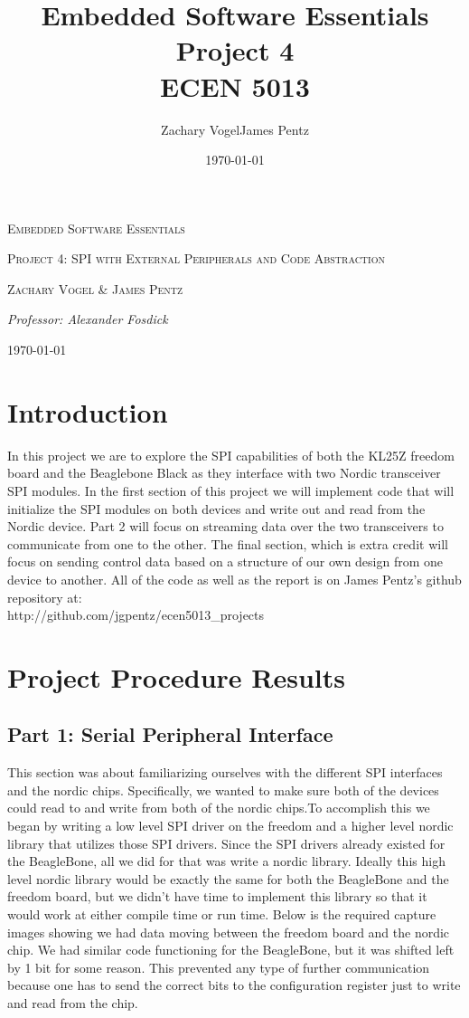 \documentclass{article}
\author{Zachary Vogel\quad James Pentz}
\title{Embedded Software Essentials Project 4\\ ECEN 5013}
\date{\today}
\begin{document}
\begin{titlepage}
    \centering
    \vspace*{2cm}
    {\scshape\Huge Embedded Software Essentials \par}
    \vspace{2cm}
    {\scshape\Large Project 4: SPI with External Peripherals and Code Abstraction \par}
    \vspace{2.5cm}
    {\Large \scshape Zachary Vogel \& James Pentz\par}
    \vspace{1cm}
    {\large \itshape Professor: Alexander Fosdick}
    \vfill
    {\large \today\par}
\end{titlepage}

\section*{Introduction}
In this project we are to explore the SPI capabilities of both the KL25Z freedom board and the Beaglebone Black as they interface with two Nordic transceiver SPI modules. In the first section of this project we will implement code that will initialize the SPI modules on both devices and write out and read from the Nordic device. Part 2 will focus on streaming data over the two transceivers to communicate from one to the other. The final section, which is extra credit will focus on
sending control data based on a structure of our own design from one device to another. All of the code as well as the report is on James Pentz's github repository at:\\

http://github.com/jgpentz/ecen5013\_projects

\section*{Project Procedure Results}
\subsection*{Part 1: Serial Peripheral Interface}
This section was about familiarizing ourselves with the different SPI interfaces and the nordic chips. Specifically, we wanted to make sure both of the devices could read to and write from both of the nordic chips.To accomplish this we began by writing a low level SPI driver on the freedom and a higher level nordic library that utilizes those SPI drivers. Since the SPI drivers already existed for the BeagleBone, all we did for that was write a nordic library. Ideally this high level
nordic library would be exactly the same for both the BeagleBone and the freedom board, but we didn't have time to implement this library so that it would work at either compile time or run time. Below is the required capture images showing we had data moving between the freedom board and the nordic chip. We had similar code functioning for the BeagleBone, but it was shifted left by 1 bit for some reason. This prevented any type of further communication because one has to send the correct bits
to the configuration register just to write and read from the chip.
\end{document}
